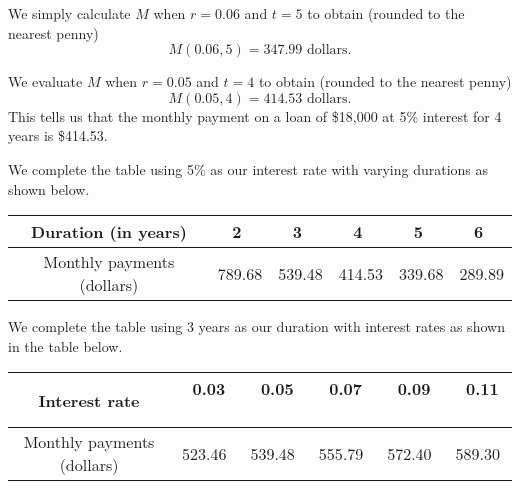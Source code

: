 \begin{activitySolution}
    \ba
    \item We simply calculate $M$ when $r=0.06$ and $t=5$ to obtain (rounded to the nearest penny)
\[M(0.06,5) = 347.99 \text{ dollars}.\]

    \item We evaluate $M$ when $r=0.05$ and $t=4$ to obtain (rounded to the nearest penny)
\[M(0.05,4) = 414.53 \text{ dollars}.\]
This tells us that the monthly payment on a loan of \$18,000 at 5\% interest for 4 years is \$414.53.

\item We complete the table using 5\% as our interest rate with varying durations as shown below.

    \begin{center}
    \renewcommand{\arraystretch}{1.5}
    \begin{tabular}{|c|c|c|c|c|c|} \hline
    Duration (in years)  &\ 2 \    & \ 3 \     & \ 4 \     & \ 5 \    & \ 6 \  \\ \hline
    Monthly payments (dollars)    & 789.68      & 539.48      & 414.53      & 339.68      & 289.89 \\ \hline
    \end{tabular}
    \end{center}

    \item We complete the table using 3 years as our duration with interest rates as shown in the table below. 

    \begin{center}
    \renewcommand{\arraystretch}{1.5}
    \begin{tabular}{|c|c|c|c|c|c|} \hline
    Interest rate  &\ 0.03 \    & \ 0.05 \     & \ 0.07 \     & \ 0.09 \    & \ 0.11 \  \\ \hline
    Monthly payments (dollars)    & 523.46       & 539.48      & 555.79      & 572.40      & 589.30 \\ \hline
    \end{tabular}
    \end{center}


\end{activitySolution}
